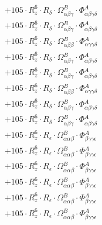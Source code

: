 \documentclass{article}
\begin{document}
\begin{subequations}
\begin{gather}
\begin{array}{c}
 \\[0.2em] 		 + 105 \cdot R_{z}^{6} \cdot R_{\delta{}} \cdot \Omega{}^{B}_{\alpha{}\beta{}\gamma{}} \cdot \Phi{}^{A}_{\alpha{}\beta{}\gamma{}\delta{}} 
 \\[0.2em] 		 + 105 \cdot R_{z}^{6} \cdot R_{\delta{}} \cdot \Omega{}^{B}_{\alpha{}\beta{}\gamma{}} \cdot \Phi{}^{A}_{\alpha{}\beta{}\gamma{}\delta{}} 
 \\[0.2em] 		 + 105 \cdot R_{z}^{6} \cdot R_{\delta{}} \cdot \Omega{}^{B}_{\alpha{}\beta{}\beta{}} \cdot \Phi{}^{A}_{\alpha{}\gamma{}\gamma{}\delta{}} 
 \\[0.2em] 		 + 105 \cdot R_{z}^{6} \cdot R_{\delta{}} \cdot \Omega{}^{B}_{\alpha{}\beta{}\gamma{}} \cdot \Phi{}^{A}_{\alpha{}\beta{}\gamma{}\delta{}} 
 \\[0.2em] 		 + 105 \cdot R_{z}^{6} \cdot R_{\delta{}} \cdot \Omega{}^{B}_{\alpha{}\beta{}\gamma{}} \cdot \Phi{}^{A}_{\alpha{}\beta{}\gamma{}\delta{}} 
 \\[0.2em] 		 + 105 \cdot R_{z}^{6} \cdot R_{\delta{}} \cdot \Omega{}^{B}_{\alpha{}\beta{}\beta{}} \cdot \Phi{}^{A}_{\alpha{}\gamma{}\gamma{}\delta{}} 
 \\[0.2em] 		 + 105 \cdot R_{z}^{6} \cdot R_{\delta{}} \cdot \Omega{}^{B}_{\alpha{}\beta{}\gamma{}} \cdot \Phi{}^{A}_{\alpha{}\beta{}\gamma{}\delta{}} 
 \\[0.2em] 		 + 105 \cdot R_{z}^{6} \cdot R_{\delta{}} \cdot \Omega{}^{B}_{\alpha{}\beta{}\gamma{}} \cdot \Phi{}^{A}_{\alpha{}\beta{}\gamma{}\delta{}} 
 \\[0.2em] 		 + 105 \cdot R_{z}^{6} \cdot R_{\epsilon{}} \cdot \Omega{}^{B}_{\alpha{}\alpha{}\beta{}} \cdot \Phi{}^{A}_{\beta{}\gamma{}\gamma{}\epsilon{}} 
 \\[0.2em] 		 + 105 \cdot R_{z}^{6} \cdot R_{\epsilon{}} \cdot \Omega{}^{B}_{\alpha{}\alpha{}\beta{}} \cdot \Phi{}^{A}_{\beta{}\gamma{}\gamma{}\epsilon{}} 
 \\[0.2em] 		 + 105 \cdot R_{z}^{6} \cdot R_{\epsilon{}} \cdot \Omega{}^{B}_{\alpha{}\alpha{}\beta{}} \cdot \Phi{}^{A}_{\beta{}\gamma{}\gamma{}\epsilon{}} 
 \\[0.2em] 		 + 105 \cdot R_{z}^{6} \cdot R_{\epsilon{}} \cdot \Omega{}^{B}_{\alpha{}\alpha{}\beta{}} \cdot \Phi{}^{A}_{\beta{}\gamma{}\gamma{}\epsilon{}} 
 \\[0.2em] 		 + 105 \cdot R_{z}^{6} \cdot R_{\epsilon{}} \cdot \Omega{}^{B}_{\alpha{}\alpha{}\beta{}} \cdot \Phi{}^{A}_{\beta{}\gamma{}\gamma{}\epsilon{}} 
 \\[0.2em] 		 + 105 \cdot R_{z}^{6} \cdot R_{\epsilon{}} \cdot \Omega{}^{B}_{\alpha{}\alpha{}\beta{}} \cdot \Phi{}^{A}_{\beta{}\gamma{}\gamma{}\epsilon{}} 

\end{array}
\end{gather}
\end{subequations}
\end{document}

